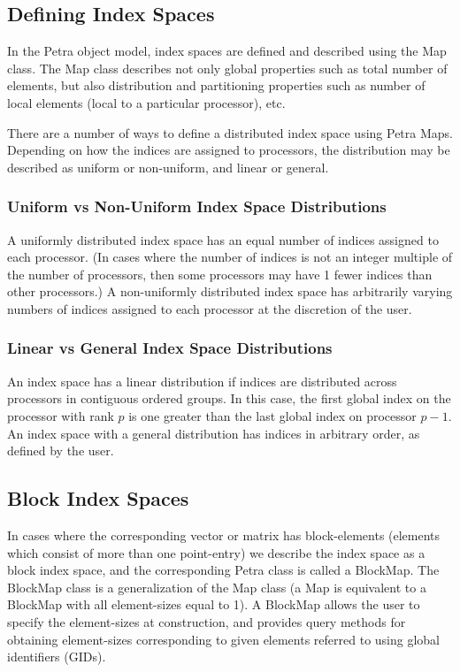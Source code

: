 \documentclass[12pt,relax]{PetraObjectModel}
\begin{document}
\subsection{Defining Index Spaces}
In the Petra object model, index spaces are defined and described using the
Map class. The Map class describes not only global properties such as total
number of elements, but also distribution and partitioning properties such as
number of local elements (local to a particular processor), etc.
 
There are a number of ways to define a distributed index space using Petra
Maps. Depending on how the indices are assigned to processors, the distribution
may be described as uniform or non-uniform, and linear or general.

\subsubsection{Uniform vs Non-Uniform Index Space Distributions}
A uniformly distributed index space has an equal number of indices assigned
to each processor. (In cases where the number of indices is not an integer
multiple of the number of processors, then some processors may have 1 fewer
indices than other processors.) A non-uniformly distributed index space has
arbitrarily varying numbers of indices assigned to each processor at
the discretion of the user.

\subsubsection{Linear vs General Index Space Distributions}
An index space has a linear distribution if indices are distributed across
processors in contiguous ordered groups. In this case, the first global index
on the processor with rank $p$ is one greater than the last global index on
processor $p-1$. An index space with
a general distribution has indices in arbitrary order, as defined by the user.

\subsection{Block Index Spaces}
In cases where the corresponding vector or matrix has block-elements (elements
which consist of more than one point-entry) we describe the index space as a
block index space, and the corresponding Petra class is called a BlockMap. The
BlockMap class is a generalization of the Map class (a Map is equivalent to a
BlockMap with all element-sizes equal to 1). A BlockMap allows the user to
specify the element-sizes at construction, and provides query methods for
obtaining element-sizes corresponding to given elements referred to using
global identifiers (GIDs).
\end{document}
